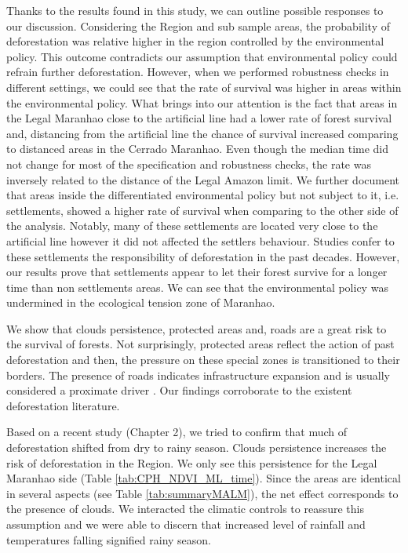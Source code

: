Thanks to the results found in this study, we can outline possible responses to our discussion. Considering the Region and sub sample areas, the probability of deforestation was relative higher in the region controlled by the environmental policy. This outcome contradicts our assumption that environmental policy could refrain further deforestation. However, when we performed robustness checks in different settings, we could see that the rate of survival was higher in areas within the environmental policy. What brings into our attention is the fact that areas in the Legal Maranhao close to the artificial line had a lower rate of forest survival and, distancing from the artificial line the chance of survival increased comparing to distanced areas in the Cerrado Maranhao. Even though the median time did not change for most of the specification and robustness checks, the rate was inversely related to the distance of the Legal Amazon limit. We further document that areas inside the differentiated environmental policy but not subject to it, i.e. settlements, showed a higher rate of survival when comparing to the other side of the analysis. Notably, many of these settlements are located very close to the artificial line however it did not affected the settlers behaviour. Studies confer to these settlements the responsibility of deforestation in the past decades. However, our results prove that settlements appear to let their forest survive for a longer time than non settlements areas. We can see that the environmental policy was undermined in the ecological tension zone of Maranhao. 

We show that clouds persistence, protected areas and, roads are a great risk to the survival of forests. Not surprisingly, protected areas reflect the action of past deforestation and then, the pressure on these special zones is transitioned to their borders. The presence of roads indicates infrastructure expansion and is usually considered a proximate driver \citep{LAMBIN1,LAMBIN2}. Our findings corroborate to the existent deforestation literature. 

Based on a recent study (Chapter 2), we tried to confirm that much of deforestation shifted from dry to rainy season. Clouds persistence increases the risk of deforestation in the Region. We only see this persistence for the Legal Maranhao side (Table \ref{tab:CPH_NDVI_ML_time}). Since the areas are identical in several aspects (see Table \ref{tab:summaryMALM}), the net effect corresponds to the presence of clouds. We interacted the climatic controls to reassure this assumption and we were able to discern that increased level of rainfall and temperatures falling signified rainy season. 

